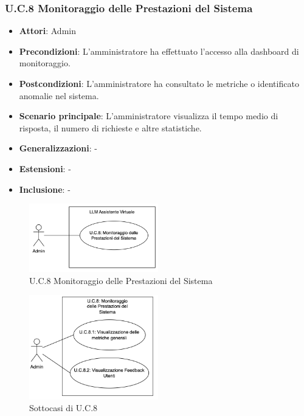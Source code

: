 \subsubsection{U.C.8 Monitoraggio delle Prestazioni del Sistema}
\begin{itemize}
    \item \textbf{Attori}: Admin
    \item \textbf{Precondizioni}: L’amministratore ha effettuato l’accesso alla dashboard di monitoraggio.
    \item \textbf{Postcondizioni}: L’amministratore ha consultato le metriche o identificato anomalie nel sistema.
    \item \textbf{Scenario principale}: L’amministratore visualizza il tempo medio di risposta, il numero di richieste e altre statistiche.
    \item \textbf{Generalizzazioni}: -
    \item \textbf{Estensioni}: -
    \item \textbf{Inclusione}: -
\end{itemize}
\begin{figure}[h!]
    \centering
    \includegraphics[width=0.5\textwidth]{img/UC8.png}
    \caption{U.C.8 Monitoraggio delle Prestazioni del Sistema}
\end{figure}
\begin{figure}[h!]
    \centering
    \includegraphics[width=0.5\textwidth]{img/UC8p1.png}
    \caption{Sottocasi di U.C.8}
\end{figure}
